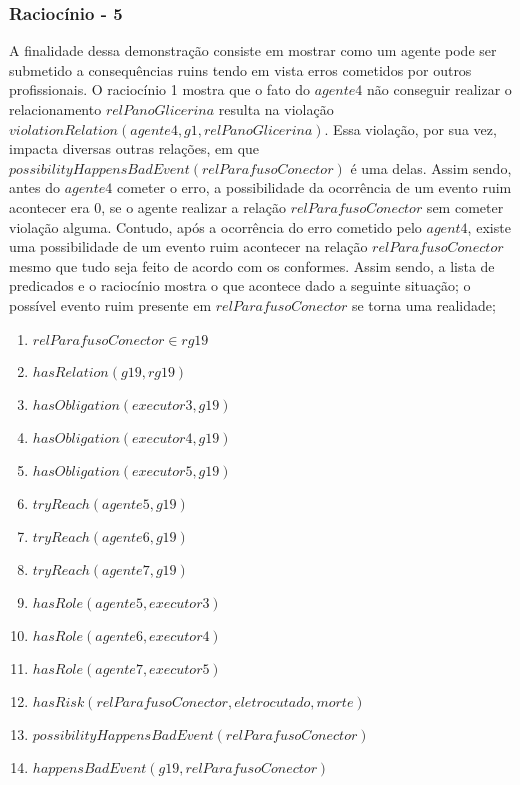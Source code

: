 \subsubsection{Raciocínio - 5} 
\label{raciocinio5}
A finalidade dessa demonstração consiste em mostrar como um agente pode ser submetido a consequências ruins tendo em vista erros cometidos por outros profissionais. O raciocínio 1 mostra que o fato do $agente4$ não conseguir realizar o relacionamento $relPanoGlicerina$ resulta na violação $violationRelation(agente4,g1,relPanoGlicerina)$. Essa violação, por sua vez, impacta diversas outras relações, em que 
$possibilityHappensBadEvent(relParafusoConector)$ é uma delas. Assim sendo, antes do $agente4$ cometer o erro, a possibilidade da ocorrência de um evento ruim acontecer era 0, se o agente realizar a relação $relParafusoConector$ sem cometer violação alguma. Contudo, após a ocorrência do erro cometido pelo $agent4$, existe uma possibilidade de um evento ruim acontecer na relação $relParafusoConector$ mesmo que tudo seja feito de acordo com os conformes. Assim sendo, a lista de predicados e o raciocínio mostra o que acontece dado a seguinte situação; o possível evento ruim presente em $relParafusoConector$ 
se torna uma realidade;  

\begin{enumerate}
	\item $relParafusoConector \in rg19$	
	\item $hasRelation(g19,rg19)$		
	\item $hasObligation(executor3,g19)$
	\item $hasObligation(executor4,g19)$
	\item $hasObligation(executor5,g19)$		
	\item $tryReach(agente5,g19)$
	\item $tryReach(agente6,g19)$
	\item $tryReach(agente7,g19)$									
	\item $hasRole(agente5,executor3)$
	\item $hasRole(agente6,executor4)$
	\item $hasRole(agente7,executor5)$
	\item $hasRisk(relParafusoConector,eletrocutado,morte)$
	\item $possibilityHappensBadEvent(relParafusoConector)$
	\item $happensBadEvent(g19,relParafusoConector)$	
\end{enumerate}


